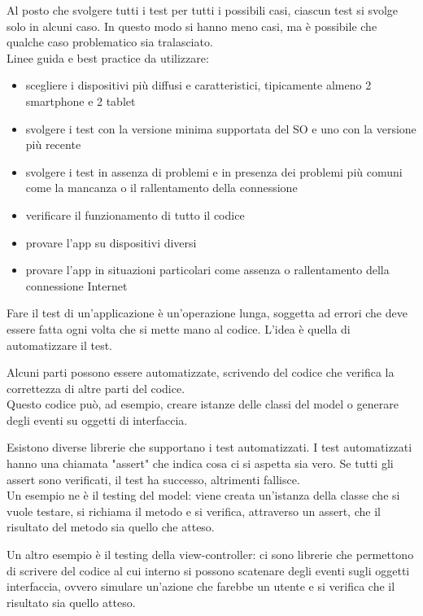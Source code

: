 Al posto che svolgere tutti i test per tutti i possibili casi, ciascun test si svolge solo in alcuni caso. In questo modo si hanno meno casi, ma è possibile che qualche caso problematico sia tralasciato. 
\\ Linee guida e best practice da utilizzare:
\begin{itemize}
    \item scegliere i dispositivi più diffusi e caratteristici, tipicamente almeno 2 smartphone e 2 tablet
    \item svolgere i test con la versione minima supportata del SO e uno con la versione più recente
    \item svolgere i test in assenza di problemi e in presenza dei problemi più comuni come la mancanza o il rallentamento della connessione
    \item verificare il funzionamento di tutto il codice
    \item provare l'app su dispositivi diversi
    \item provare l'app in situazioni particolari come assenza o rallentamento della connessione Internet
\end{itemize}

Fare il test di un’applicazione è un’operazione lunga, soggetta ad 
errori che deve essere fatta ogni volta che si mette mano al codice. L'idea è quella di automatizzare il test. 

Alcuni parti possono essere automatizzate, scrivendo del codice che verifica la correttezza di altre parti del codice. 
\\ Questo codice può, ad esempio, creare istanze delle classi del model o generare degli eventi su oggetti di interfaccia. 

Esistono diverse librerie che supportano i test automatizzati. I test automatizzati hanno una chiamata "assert" che indica cosa ci si aspetta sia vero. 
Se tutti gli assert sono verificati, il test ha successo, altrimenti fallisce.
\\ Un esempio ne è il testing del model: viene creata un'istanza della classe che si vuole testare, si richiama il metodo e si verifica, attraverso un assert, che il risultato del metodo sia quello che atteso.
 
Un altro esempio è il testing della view-controller: ci sono librerie che permettono di scrivere del codice al cui interno si possono scatenare degli eventi sugli oggetti interfaccia, ovvero simulare un'azione che farebbe un utente e si verifica che il risultato sia quello atteso.

